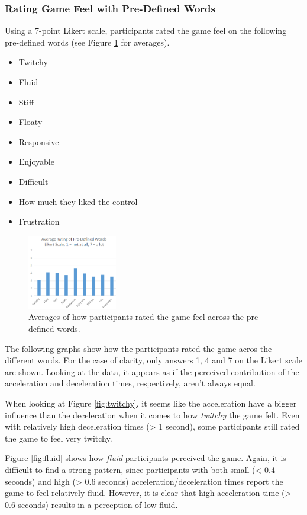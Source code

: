\subsubsection{Rating Game Feel with Pre-Defined Words}
Using a 7-point Likert scale, participants rated the game feel on the following pre-defined words (see Figure \ref{fig:average_rating} for averages).
\begin{itemize}[noitemsep,nolistsep]
\item Twitchy
\item Fluid
\item Stiff
\item Floaty
\item Responsive
\item Enjoyable
\item Difficult
\item How much they liked the control
\item Frustration
\end{itemize}

\begin{figure}[htbp]
\centering
\includegraphics[width=0.35\textwidth]{Pics/average_rating}
\caption{Averages of how participants rated the game feel across the pre-defined words.}
\label{fig:average_rating}
\end{figure}

The following graphs show how the participants rated the game acros the different words. For the case of clarity, only answers 1, 4 and 7 on the Likert scale are shown. Looking at the data, it appears as if the perceived contribution of the acceleration and deceleration times, respectively, aren't always equal.

When looking at Figure \ref{fig:twitchy}, it seems like the acceleration have a bigger influence than the deceleration when it comes to how \textit{twitchy} the game felt. Even with relatively high deceleration times (> 1 second), some participants still rated the game to feel very twitchy.

Figure \ref{fig:fluid} shows how \textit{fluid} participants perceived the game. Again, it is difficult to find a strong pattern, since participants with both small (< 0.4 seconds) and high (> 0.6 seconds) acceleration/deceleration times report the game to feel relatively fluid. However, it is clear that high acceleration time (> 0.6 seconds) results in a perception of low fluid.

